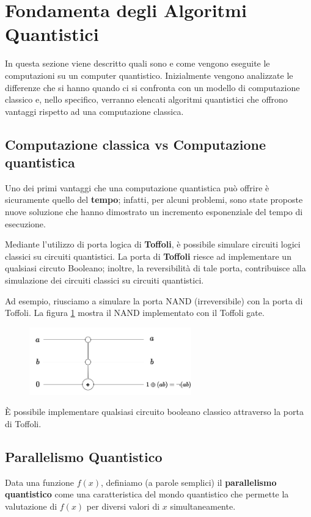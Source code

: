 \section{Fondamenta degli Algoritmi Quantistici}
In questa sezione viene descritto quali sono e come vengono eseguite
le computazioni su un computer quantistico. Inizialmente vengono analizzate
le differenze che si hanno quando ci si confronta con un modello di computazione classico
e, nello specifico, verranno elencati algoritmi quantistici che offrono
vantaggi rispetto ad una computazione classica.
\subsection{Computazione classica vs Computazione quantistica}
Uno dei primi vantaggi che una computazione quantistica può offrire
è sicuramente quello del \textbf{tempo}; infatti, per alcuni problemi, sono state proposte
nuove soluzione che hanno dimostrato un incremento esponenziale del tempo di esecuzione.

Mediante l'utilizzo di porta logica di \textbf{Toffoli}, è possibile simulare circuiti 
logici classici su circuiti quantistici. La porta di \textbf{Toffoli} riesce
ad implementare un qualsiasi circuto Booleano; inoltre, la reversibilità di tale porta,
contribuisce alla simulazione dei circuiti classici su circuiti quantistici.

Ad esempio, riusciamo a simulare la porta NAND (irreversibile) con la porta di Toffoli.
La figura \ref{fig13} mostra il NAND implementato con il Toffoli gate.
\begin{figure}[h]
    \centering
    \includegraphics[width = 7cm]{./Images/toff.png}
    \caption{}
    \label{fig13}
\end{figure}

\begin{fact}{}{}
    È possibile implementare qualsiasi circuito booleano classico attraverso la porta di Toffoli.
\end{fact}

\subsection{Parallelismo Quantistico}
Data una funzione $f(x)$, definiamo (a parole semplici) il \textbf{parallelismo
quantistico} come una caratteristica del mondo quantistico che permette
la valutazione di $f(x)$ per diversi valori di $x$ simultaneamente.

